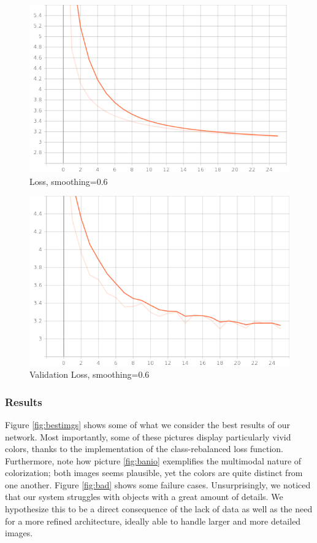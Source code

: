 \documentclass[twoside,twocolumn]{article}
\begin{document}
\begin{figure}
	\includegraphics[width=\linewidth]{img/loss.png}
	\caption{Loss, smoothing=0.6}
	\label{fig:loss}
\end{figure}

\begin{figure}
	\includegraphics[width=\linewidth]{img/val_loss.png}
	\caption{Validation Loss, smoothing=0.6}
	\label{fig:valloss}
\end{figure}

\subsubsection{Results}

Figure \ref{fig:bestimgs} shows some of what we consider the best results of our network. Most importantly, some of these pictures display particularly vivid colors, thanks to the implementation of the class-rebalanced loss function. Furthermore, note how picture \ref{fig:banio} exemplifies the multimodal nature of colorization; both images seems plausible, yet the colors are quite distinct from one another.
Figure \ref{fig:bad} shows some failure cases. Unsurprisingly, we noticed that our system struggles with objects with a great amount of details. We hypothesize this to be a direct consequence of the lack of data as well as the need for a more refined architecture, ideally able to handle larger and more detailed images.
\end{document}
